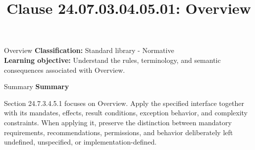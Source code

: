 \documentclass[10pt,letterpaper]{article}
\title{Clause 24.07.03.04.05.01: Overview}
\author{}
\date{}
\begin{document}
\maketitle
\begin{CornellOverviewBox}{Overview}
\textbf{Classification:} Standard library - Normative\\[2pt]
\textbf{Learning objective:} Understand the rules, terminology, and semantic consequences associated with Overview.
\end{CornellOverviewBox}\begin{CornellSummaryBox}{Summary}
{\sffamily\bfseries\color{Accent} Summary}\par\vspace{3pt}Section 24.7.3.4.5.1 focuses on Overview. Apply the specified interface together with its mandates, effects, result conditions, exception behavior, and complexity constraints. When applying it, preserve the distinction between mandatory requirements, recommendations, permissions, and behavior deliberately left undefined, unspecified, or implementation-defined.
\end{CornellSummaryBox}
\end{document}
